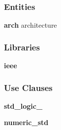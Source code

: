 \subsubsection*{Entities}
\begin{DoxyCompactItemize}
\item 
{\bf arch} architecture
\end{DoxyCompactItemize}
\subsubsection*{Libraries}
 \begin{DoxyCompactItemize}
\item 
{\bf ieee} 
\end{DoxyCompactItemize}
\subsubsection*{Use Clauses}
 \begin{DoxyCompactItemize}
\item 
{\bf std\+\_\+logic\+\_}   
\item 
{\bf numeric\+\_\+std}   
\end{DoxyCompactItemize}

